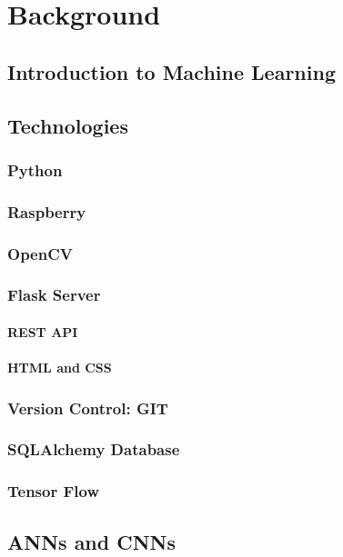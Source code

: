\chapter{Background}
\label{background}

\section{Introduction to Machine Learning}
\section{Technologies}
	\subsection{Python}
	\subsection{Raspberry}
	\subsection{OpenCV}
	\subsection{Flask Server}
		\subsubsection{REST API}
		\subsubsection{HTML and CSS}
	\subsection{Version Control: GIT}	%
	\subsection{SQLAlchemy Database}
	\subsection{Tensor Flow}	%
\section{ANNs and CNNs}
